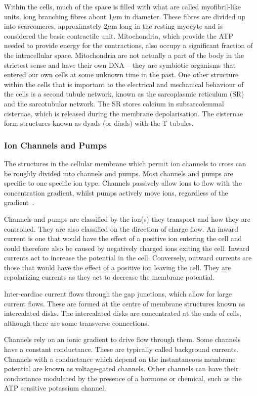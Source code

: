 Within the cells, much of the space is filled with what are called
myofibril-like units, long branching fibres about 1$\mu$m in diameter.
These fibres are divided up into scarcomeres, approximately 2$\mu$m long in the
resting myocyte and is considered the basic contractile unit.
Mitochondria, which provide the ATP needed to provide energy for the
contractions, also occupy a significant fraction of the intracellular space.
Mitochondria are not actually a part of the body in the strictest sense and
have their own DNA -- they are symbiotic organisms that entered our own cells
at some unknown time in the past.
One other structure within the cells that is important to the electrical and
mechanical behaviour of the cells is a second tubule network, known as the
sarcoplasmic reticulum (SR) and the sarcotubular network.
The SR stores calcium in subsarcolemmal cisternae, which is released during the
membrane depolarisation.
The cisternae form structures known as dyads (or diads) with the T tubules.

\subsubsection{Ion Channels and Pumps}

The structures in the cellular membrane which permit ion channels to cross can
be roughly divided into channels and pumps.
Most channels and pumps are specific to one specific ion type.
Channels passively allow ions to flow with the concentration gradient, whilst
pumps actively move ions, regardless of the gradient~\cite{Hille2001}.

Channels and pumps are classified by the ion(s) they transport and how they are
controlled.
They are also classified on the direction of charge flow.
An inward current is one that would have the effect of a positive ion entering
the cell and could therefore also be caused by negatively charged ions exiting
the cell.
Inward currents act to increase the potential in the cell.
Conversely, outward currents are those that would have the effect of a positive
ion leaving the cell.
They are repolarizing currents as they act to decrease the membrane potential.

Inter-cardiac current flows through the gap junctions, which allow for large
current flows.
These are formed at the centre of membrane structures known as intercalated
disks.
The intercalated disks are concentrated at the ends of cells, although there are
some transverse connections.

Channels rely on an ionic gradient to drive flow through them.
Some channels have a constant conductance.
These are typically called background currents.
Channels with a conductance which depend on the instantaneous membrane potential
are known as voltage-gated channels.
Other channels can have their conductance modulated by the presence of a
hormone or chemical, such as the ATP sensitive potassium channel.

